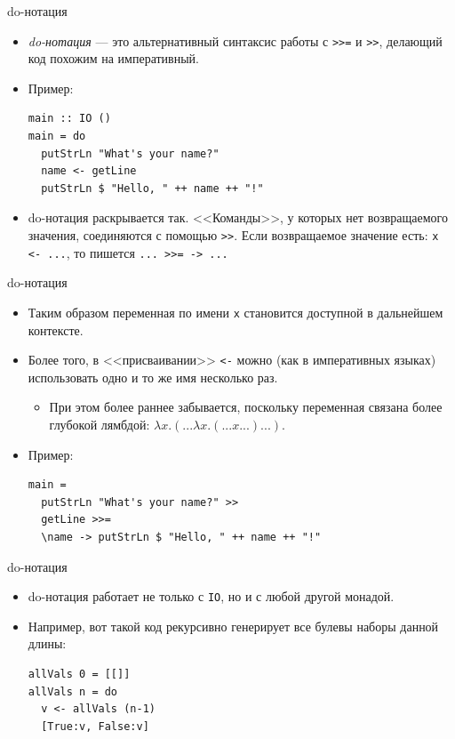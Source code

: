 \documentclass[xcolor=dvipsnames]{beamer}
\begin{document}
\begin{frame}[fragile]{do-нотация}
 
 \begin{itemize}[<+->]
  \item {\em do-нотация} --- это альтернативный синтаксис работы с \texttt{>>=} и \texttt{>>}, делающий код похожим на императивный.
  \item Пример:
\begin{verbatim}
main :: IO ()
main = do
  putStrLn "What's your name?"
  name <- getLine
  putStrLn $ "Hello, " ++ name ++ "!"
\end{verbatim}
\item do-нотация раскрывается так. <<Команды>>, у которых нет возвращаемого значения, соединяются с помощью \texttt{>>}. Если возвращаемое значение есть: \texttt{x} \texttt{<- ...}, то пишется \texttt{... >>= \x -> ...}
 \end{itemize}

\end{frame}


\begin{frame}[fragile]{do-нотация}
 
 \begin{itemize}[<+->]
 \item Таким образом переменная по имени {\tt x} становится доступной в дальнейшем контексте.
 \item Более того, в <<присваивании>> \texttt{<-} можно (как в императивных языках) использовать одно и то же имя несколько раз.
 \begin{itemize}
 \item При этом более раннее забывается, поскольку переменная связана более глубокой лямбдой: $\lambda x. (... \lambda x. (... x ...) ...)$.
 \end{itemize}
 \item Пример:
 \begin{verbatim}
main =
  putStrLn "What's your name?" >>
  getLine >>=
  \name -> putStrLn $ "Hello, " ++ name ++ "!"
 \end{verbatim}
 
 \end{itemize}

\end{frame}

\begin{frame}[fragile]{do-нотация}
 \begin{itemize}[<+->]
 \item do-нотация работает не только с \texttt{IO}, но и с любой другой монадой.
 \item Например, вот такой код рекурсивно генерирует все булевы наборы данной длины:
 
 {
\scriptsize
\begin{verbatim}
allVals 0 = [[]]
allVals n = do
  v <- allVals (n-1)
  [True:v, False:v]
\end{verbatim}

}

\end{itemize}
\end{frame}
\end{document}
